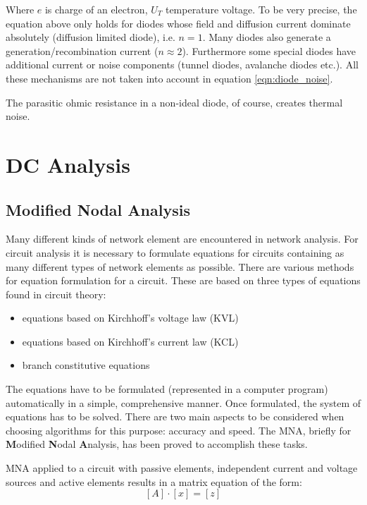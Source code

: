 \documentclass[10pt]{report}
\begin{document}
Where $e$ is charge of an electron, $U_T$ temperature voltage.  To be
very precise, the equation above only holds for diodes whose field and
diffusion current dominate absolutely (diffusion limited diode),
i.e. $n=1$.  Many diodes also generate a generation/recombination
current ($n\approx 2$).  Furthermore some special diodes have
additional current or noise components (tunnel diodes, avalanche
diodes etc.).  All these mechanisms are not taken into account in
equation \eqref{eqn:diode_noise}.

\addvspace{12pt}

The parasitic ohmic resistance in a non-ideal diode, of course,
creates thermal noise.


\chapter{DC Analysis}

\section{Modified Nodal Analysis}

Many different kinds of network element are encountered in network
analysis.  For circuit analysis it is necessary to formulate equations
for circuits containing as many different types of network elements as
possible.  There are various methods for equation formulation for a
circuit.  These are based on three types of equations found in circuit
theory:

\begin{itemize}
\item equations based on Kirchhoff's voltage law (KVL)
\item equations based on Kirchhoff's current law (KCL)
\item branch constitutive equations
\end{itemize}

The equations have to be formulated (represented in a computer
program) automatically in a simple, comprehensive manner.  Once
formulated, the system of equations has to be solved.  There are two
main aspects to be considered when choosing algorithms for this
purpose: accuracy and speed.  The MNA, briefly for \textbf{M}odified
\textbf{N}odal \textbf{A}nalysis, has been proved to accomplish these
tasks.

MNA applied to a circuit with passive elements, independent current
and voltage sources and active elements results in a matrix equation
of the form:
\begin{equation}
\left[A\right] \cdot \left[x\right] = \left[z\right]
\end{equation}
\end{document}
